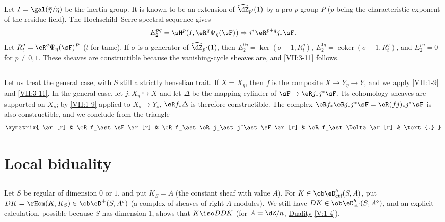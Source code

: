 \documentclass[oneside]{book}
\begin{document}
Let $I=\gal(\bar\eta/\eta)$ be the inertia group. It is known to be an
extension of $\widehat\dZ_{p'}(1)$ by a pro-$p$ group $P$ ($p$ being the
characteristic exponent of the residue field). The Hochschild--Serre spectral
sequence gives
\[
  E_2^{p q} = \sH^p(I,\eR^q\Psi_\eta(\sF))\Rightarrow i^\ast \eR^{p+q}j_\ast\sF \text{.} 
\]
Let $R_t^q = \eR^q\Psi_\eta(\sF)^P$ ($t$ for tame). If $\sigma$ is a
generator of $\widehat\dZ_{p'}(1)$, then
$E_2^{0 q} = \ker(\sigma-1,R_t^q)$,
$E_2^{1 q} = \operatorname{coker}(\sigma-1,R_t^q)$, and $E_2^{p q} = 0$ for
$p\ne 0,1$. These sheaves are constructible because the vanishing-cycle
sheaves are, and \ref{VII:3-11} follows.






\subsection{}\label{VII:3-12}

Let us treat the general case, with $S$ still a strictly henselian trait. If
$X=X_\eta$, then $f$ is the composite $X\to Y_\eta \to Y$, and we apply
\ref{VII:1-9} and \ref{VII:3-11}. In the general case, let
$j:X_\eta\hookrightarrow X$ and let $\Delta$ be the mapping cylinder of
$\sF \to \eR j_\ast j^\ast \sF$. Its cohomology sheaves are supported on
$X_s$; by \ref{VII:1-9} applied to $X_s \to Y_s$,
$\eR f_\ast \Delta$ is therefore constructible. The complex
$\eR f_\ast \eR j_\ast j^\ast \sF = \eR(f j)_\ast j^\ast \sF$ is also
constructible, and we conclude from the triangle
\[\xymatrix{
  \ar[r] 
    & \eR f_\ast \sF \ar[r] 
    & \eR f_\ast \eR j_\ast j^\ast \sF \ar[r] 
    & \eR f_\ast \Delta \ar[r] 
    & \text{.} 
}\]










\section{Local biduality}\label{VII:4}






\subsection{}\label{VII:4-1}

Let $S$ be regular of dimension $0$ or $1$, and put $K_S=A$ (the constant
sheaf with value $A$). For $K\in\ob\eD_\text{ctf}^b(S,A)$, put
$D K=\rHom(K,K_S)\in\ob\eD^+(S,A^\circ)$ (a complex of sheaves of right
$A$-modules). We still have $D K\in\ob\eD_\text{ctf}^b(S,A^\circ)$, and an explicit
calculation, possible because $S$ has dimension $1$, shows that
$K\iso D D K$ (for $A=\dZ/n$, \hyperref[V]{Duality} \ref{V:1-4}).
\end{document}
